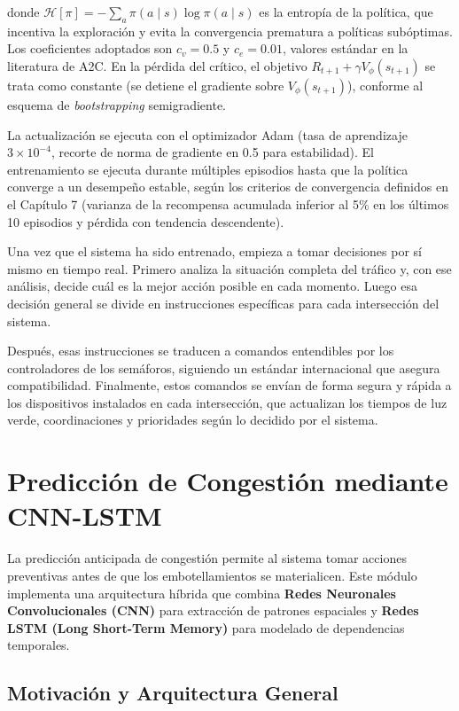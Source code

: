 \documentclass[12pt,a4paper,oneside]{report}
\begin{document}
donde \(\mathcal{H}[\pi] = -\sum_{a}\pi(a \mid s)\log\pi(a \mid s)\) es la entropía de la política, que incentiva la exploración y evita la convergencia prematura a políticas subóptimas. Los coeficientes adoptados son \(c_{v} = 0.5\) y \(c_{e} = 0.01\), valores estándar en la literatura de A2C. En la pérdida del crítico, el objetivo \(R_{t+1} + \gamma V_{\phi}(s_{t+1})\) se trata como constante (se detiene el gradiente sobre \(V_{\phi}(s_{t+1})\)), conforme al esquema de \emph{bootstrapping} semigradiente.

La actualización se ejecuta con el optimizador Adam (tasa de aprendizaje \(3 \times 10^{-4}\), recorte de norma de gradiente en 0.5 para estabilidad). El entrenamiento se ejecuta durante múltiples episodios hasta que la política converge a un desempeño estable, según los criterios de convergencia definidos en el Capítulo 7 (varianza de la recompensa acumulada inferior al 5\% en los últimos 10 episodios y pérdida con tendencia descendente).

Una vez que el sistema ha sido entrenado, empieza a tomar decisiones por sí mismo en tiempo real. Primero analiza la situación completa del tráfico y, con ese análisis, decide cuál es la mejor acción posible en cada momento. Luego esa decisión general se divide en instrucciones específicas para cada intersección del sistema.

Después, esas instrucciones se traducen a comandos entendibles por los controladores de los semáforos, siguiendo un estándar internacional que asegura compatibilidad. Finalmente, estos comandos se envían de forma segura y rápida a los dispositivos instalados en cada intersección, que actualizan los tiempos de luz verde, coordinaciones y prioridades según lo decidido por el sistema.

\section{Predicción de Congestión mediante CNN-LSTM}\label{predicciuxf3n-de-congestiuxf3n-mediante-cnn-lstm}

La predicción anticipada de congestión permite al sistema tomar acciones preventivas antes de que los embotellamientos se materialicen. Este módulo implementa una arquitectura híbrida que combina \textbf{Redes Neuronales Convolucionales (CNN)} para extracción de patrones espaciales y \textbf{Redes LSTM (Long Short-Term Memory)} para modelado de dependencias temporales.

\subsection{Motivación y Arquitectura General}\label{motivaciuxf3n-y-arquitectura-general}
\end{document}

